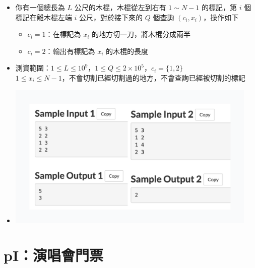 \documentclass[12pt]{article}
\begin{document}
\begin{itemize}[label={}, itemsep=0pt]
    \item 你有一個總長為 $L$ 公尺的木棍，木棍從左到右有 $1 \sim N-1$ 的標記，第 $i$ 個標記在離木棍左端 $i$ 公尺，對於接下來的 $Q$ 個查詢 $(c_i, x_i)$，操作如下
    \begin{itemize}[label={-}, itemsep=0pt]
        \item $c_i = 1$：在標記為 $x_i$ 的地方切一刀，將木棍分成兩半
        \item $c_i = 2$：輸出有標記為 $x_i$ 的木棍的長度
    \end{itemize}
    \item 測資範圍：$1 \leq L \leq 10^9$，$1 \leq Q \leq 2 \times 10^5$，$c_i = \{1, 2\}$\\
    \hspace*{5em} $1 \leq x_i \leq N-1$，不會切割已經切割過的地方，不會查詢已經被切割的標記
    \item \begin{center}\includegraphics[width=12.0cm]{img/pH}\end{center}
\end{itemize}

\section*{pI：演唱會門票}
\end{document}
